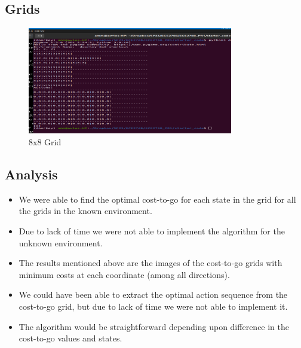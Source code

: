 \documentclass[conference]{IEEEtran}
\begin{document}
\subsection{Grids}
\begin{figure}[H]
\centering
\includegraphics[width=0.8\textwidth]{8x8_grid.png}
\caption{8x8 Grid}
\end{figure}


\subsection{Analysis}
\begin{itemize}
\item We were able to find the optimal cost-to-go for each state in the grid for all the grids in the known environment.
\item Due to lack of time we were not able to implement the algorithm for the unknown environment.
\item The results mentioned above are the images of the cost-to-go grids with minimum costs at each coordinate (among all directions).
\item We could have been able to extract the optimal action sequence from the cost-to-go grid, but due to lack of time we were not able to implement it.
\item The algorithm would be straightforward depending upon difference in the cost-to-go values and states.
\end{itemize}
\end{document}
